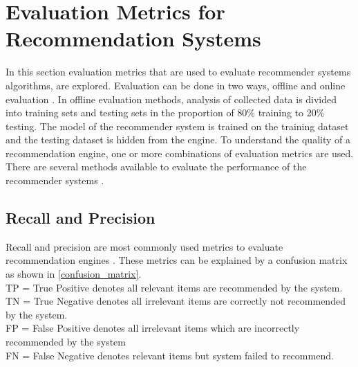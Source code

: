 
\section{Evaluation Metrics for Recommendation Systems}
\label{sec:eval_metrics}

In this section evaluation metrics that are used to evaluate recommender systems algorithms, are explored. Evaluation can be done in two ways, offline and online evaluation \cite{22,23}. In offline evaluation methods, analysis of collected data is divided into training sets and testing sets in the proportion of 80\% training to 20\% testing. The model of the recommender system is trained on the training dataset and the testing dataset is hidden from the engine. To understand the quality of a recommendation engine, one or more combinations of evaluation metrics are used. There are several methods available to evaluate the performance of the recommender systems \cite{22,24}.
  
\subsection{Recall and Precision}
\label{sec:recall_precision}
Recall and precision are most commonly used metrics to evaluate recommendation engines \cite{25}. These metrics can be explained by a confusion matrix \cite{21} as shown in \autoref{confusion_matrix}. \\
\noindent
TP = True Positive denotes all relevant items are recommended by the system.\\
TN = True Negative denotes all irrelevant items are correctly not recommended by the system.  \\
FP = False Positive denotes all irrelevant items which are
incorrectly recommended by the system\\
FN = False Negative denotes relevant items but system failed to recommend.\\

